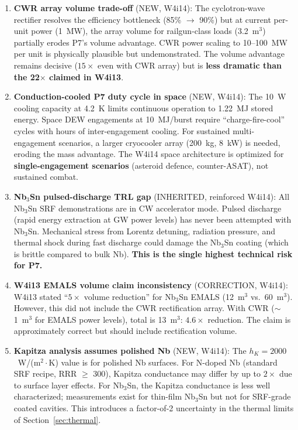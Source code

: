 \documentclass[11pt]{article}
\begin{document}
\begin{enumerate}
\item \textbf{CWR array volume trade-off} (NEW, W4i14):
  The cyclotron-wave rectifier resolves the efficiency bottleneck
  (85\% $\to$ 90\%) but at current per-unit power (1~MW), the array
  volume for railgun-class loads (3.2~m$^3$) partially erodes P7's
  volume advantage. CWR power scaling to 10--100~MW per unit is
  physically plausible but undemonstrated. The volume advantage
  remains decisive ($15\times$ even with CWR array) but is
  \textbf{less dramatic than the 22$\times$ claimed in W4i13}.

\item \textbf{Conduction-cooled P7 duty cycle in space} (NEW, W4i14):
  The 10~W cooling capacity at 4.2~K limits continuous operation
  to 1.22~MJ stored energy. Space DEW engagements at 10~MJ/burst
  require ``charge-fire-cool'' cycles with hours of inter-engagement
  cooling. For sustained multi-engagement scenarios, a larger
  cryocooler array (200~kg, 8~kW) is needed, eroding the mass
  advantage. The W4i14 space architecture is optimized for
  \textbf{single-engagement scenarios} (asteroid defence, counter-ASAT),
  not sustained combat.

\item \textbf{Nb$_3$Sn pulsed-discharge TRL gap} (INHERITED, reinforced
  W4i14): All Nb$_3$Sn SRF demonstrations are in CW accelerator
  mode. Pulsed discharge (rapid energy extraction at GW power levels)
  has never been attempted with Nb$_3$Sn. Mechanical stress from
  Lorentz detuning, radiation pressure, and thermal shock during
  fast discharge could damage the Nb$_3$Sn coating (which is brittle
  compared to bulk Nb). \textbf{This is the single highest
  technical risk for P7.}

\item \textbf{W4i13 EMALS volume claim inconsistency} (CORRECTION, W4i14):
  W4i13 stated ``$5\times$ volume reduction'' for Nb$_3$Sn EMALS
  (12~m$^3$ vs.\ 60~m$^3$). However, this did not include the CWR
  rectification array. With CWR ($\sim$1~m$^3$ for EMALS power
  levels), total is 13~m$^3$: $4.6\times$ reduction. The claim is
  approximately correct but should include rectification volume.

\item \textbf{Kapitza analysis assumes polished Nb} (NEW, W4i14):
  The $h_K = 2000$~W/(m$^2\cdot$K) value is for polished Nb surfaces.
  For N-doped Nb (standard SRF recipe, RRR $\geq$ 300), Kapitza
  conductance may differ by up to $2\times$ due to surface layer
  effects. For Nb$_3$Sn, the Kapitza conductance is less well
  characterized; measurements exist for thin-film Nb$_3$Sn but not
  for SRF-grade coated cavities. This introduces a factor-of-2
  uncertainty in the thermal limits of Section~\ref{sec:thermal}.
\end{enumerate}
\end{document}

